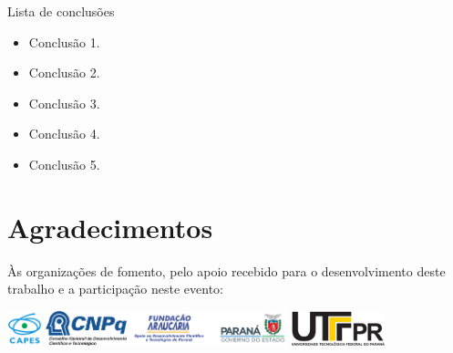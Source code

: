 \documentclass[%
  10pt,%
  aspectratio = 43,%
  compress,%
  t,%
  english,%
  brazilian,%
]{beamer}
\begin{document}
\begin{frame}
\begin{block}{Lista de conclusões}
\begin{itemize}
\item Conclusão 1.
\item Conclusão 2.
\item Conclusão 3.
\item Conclusão 4.
\item Conclusão 5.
\end{itemize}
\end{block}
\end{frame}



\section{Agradecimentos}\label{sec:agrad}


\begin{frame}{}{}
Às organizações de fomento, pelo apoio recebido para o desenvolvimento deste trabalho e a participação neste evento:
\begin{center}
\includegraphics[height = 10mm]{./Logos/apoio-capes}
\hfill%
\includegraphics[height = 10mm]{./Logos/apoio-cnpq}
\hfill%
\includegraphics[height = 10mm]{./Logos/apoio-fa-gov-pr}
\hfill%
\includegraphics[height = 10mm]{./Logos/utfpr}
\end{center}
\end{frame}


\end{document}
